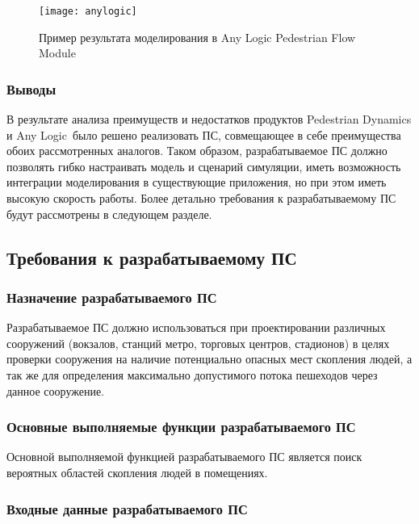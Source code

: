 \begin{figure}[ht!]
  \texttt{[image: anylogic]}
  \caption{Пример результата моделирования в Any Logic Pedestrian Flow Module}
  \label{sub:domain:analogs:anylogic:image_example}
\end{figure}

\subsubsection{Выводы}
\label{sub:domain:analogs:results}

В результате анализа преимуществ и недостатков продуктов Pedestrian Dynamics и Any Logic\textregistered\ было решено реализовать ПС, совмещающее в себе преимущества обоих рассмотренных аналогов.
Таком образом, разрабатываемое ПС должно позволять гибко настраивать модель и сценарий симуляции, иметь возможность интеграции моделирования в существующие приложения, но при этом иметь высокую скорость работы.
Более детально требования к разрабатываемому ПС будут рассмотрены в следующем разделе.

\subsection{Требования к разрабатываемому ПС}
\label{sub:domain:requirements}

\subsubsection{Назначение разрабатываемого ПС}
\label{sub:domain:requirements:purpose}

Разрабатываемое ПС должно использоваться при проектировании различных сооружений (вокзалов, станций метро, торговых центров, стадионов) в целях проверки сооружения на наличие потенциально опасных мест скопления людей, а так же для определения максимально допустимого потока пешеходов через данное сооружение.

\subsubsection{Основные выполняемые функции разрабатываемого ПС}
\label{sub:domain:requirements:purpose}

Основной выполняемой функцией разрабатываемого ПС является поиск вероятных областей скопления людей в помещениях.

\subsubsection{Входные данные разрабатываемого ПС}
\label{sub:domain:requirements:purpose}

